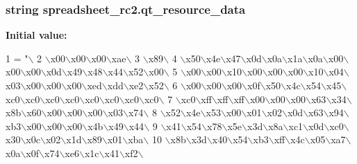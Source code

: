 \subsubsection[{qt\+\_\+resource\+\_\+data}]{\setlength{\rightskip}{0pt plus 5cm}string spreadsheet\+\_\+rc2.\+qt\+\_\+resource\+\_\+data}\label{namespacespreadsheet__rc2_adc16a82cb943707e4b093fde78afae0e}
{\bfseries Initial value\+:}
\begin{DoxyCode}
1 = \textcolor{stringliteral}{"\(\backslash\)}
2 \textcolor{stringliteral}{\(\backslash\)x00\(\backslash\)x00\(\backslash\)x00\(\backslash\)xae\(\backslash\)}
3 \textcolor{stringliteral}{\(\backslash\)x89\(\backslash\)}
4 \textcolor{stringliteral}{\(\backslash\)x50\(\backslash\)x4e\(\backslash\)x47\(\backslash\)x0d\(\backslash\)x0a\(\backslash\)x1a\(\backslash\)x0a\(\backslash\)x00\(\backslash\)x00\(\backslash\)x00\(\backslash\)x0d\(\backslash\)x49\(\backslash\)x48\(\backslash\)x44\(\backslash\)x52\(\backslash\)x00\(\backslash\)}
5 \textcolor{stringliteral}{\(\backslash\)x00\(\backslash\)x00\(\backslash\)x10\(\backslash\)x00\(\backslash\)x00\(\backslash\)x00\(\backslash\)x10\(\backslash\)x04\(\backslash\)x03\(\backslash\)x00\(\backslash\)x00\(\backslash\)x00\(\backslash\)xed\(\backslash\)xdd\(\backslash\)xe2\(\backslash\)x52\(\backslash\)}
6 \textcolor{stringliteral}{\(\backslash\)x00\(\backslash\)x00\(\backslash\)x00\(\backslash\)x0f\(\backslash\)x50\(\backslash\)x4c\(\backslash\)x54\(\backslash\)x45\(\backslash\)xc0\(\backslash\)xc0\(\backslash\)xc0\(\backslash\)xc0\(\backslash\)xc0\(\backslash\)xc0\(\backslash\)xc0\(\backslash\)xc0\(\backslash\)}
7 \textcolor{stringliteral}{\(\backslash\)xc0\(\backslash\)xff\(\backslash\)xff\(\backslash\)xff\(\backslash\)x00\(\backslash\)x00\(\backslash\)x00\(\backslash\)x63\(\backslash\)x34\(\backslash\)x8b\(\backslash\)x60\(\backslash\)x00\(\backslash\)x00\(\backslash\)x00\(\backslash\)x03\(\backslash\)x74\(\backslash\)}
8 \textcolor{stringliteral}{\(\backslash\)x52\(\backslash\)x4e\(\backslash\)x53\(\backslash\)x00\(\backslash\)x01\(\backslash\)x02\(\backslash\)x0d\(\backslash\)x63\(\backslash\)x94\(\backslash\)xb3\(\backslash\)x00\(\backslash\)x00\(\backslash\)x00\(\backslash\)x4b\(\backslash\)x49\(\backslash\)x44\(\backslash\)}
9 \textcolor{stringliteral}{\(\backslash\)x41\(\backslash\)x54\(\backslash\)x78\(\backslash\)x5e\(\backslash\)x3d\(\backslash\)x8a\(\backslash\)xc1\(\backslash\)x0d\(\backslash\)xc0\(\backslash\)x30\(\backslash\)x0c\(\backslash\)x02\(\backslash\)x1d\(\backslash\)x89\(\backslash\)x01\(\backslash\)xba\(\backslash\)}
10 \textcolor{stringliteral}{\(\backslash\)x8b\(\backslash\)x3d\(\backslash\)x40\(\backslash\)x54\(\backslash\)xb3\(\backslash\)xff\(\backslash\)x4c\(\backslash\)x05\(\backslash\)xa7\(\backslash\)x0a\(\backslash\)x0f\(\backslash\)x74\(\backslash\)xe6\(\backslash\)x1c\(\backslash\)x41\(\backslash\)xf2\(\backslash\)}

\end{DoxyCode}
